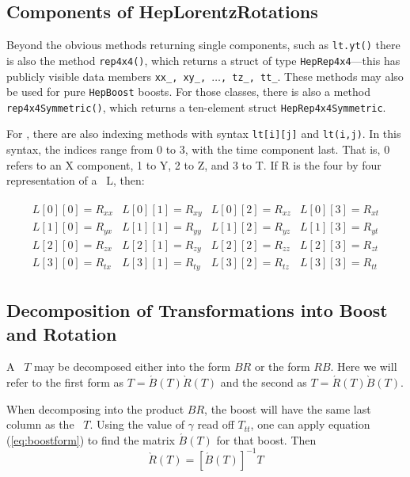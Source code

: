 \subsection{Components of HepLorentzRotations}

Beyond the obvious methods returning single components, such as 
{\tt lt.yt()} there is also the method {\tt rep4x4()}, 
which returns a struct of type {\tt HepRep4x4}---this has publicly
visible data members {\tt xx\_, xy\_, $\ldots$, tz\_, tt\_}.  These
methods may also be used for pure {\tt HepBoost} boosts.  For those
classes, there is also a method {\tt rep4x4Symmetric()}, which returns
a ten-element struct {\tt HepRep4x4Symmetric}.

For \LT, there are also indexing methods with syntax
{\tt lt[i][j]} and {\tt lt(i,j)}.  
In this syntax, the indices range from 0 to 3, with the time component last.
That is, 0 refers to an X component, 1 to Y, 2 to Z, and 3 to T.
If R is the four by four representation of a \LT\ L, then:

\begin{eqnarray}
\label{eq:ltsubscript}
\begin{array}{llll}
  L [0] [0] = R_{xx} & L [0] [1] = R_{xy} &
  L [0] [2] = R_{xz} & L [0] [3] = R_{xt} \\
\nonumber
  L [1] [0] = R_{yx} & L [1] [1] = R_{yy} &
  L [1] [2] = R_{yz} & L [1] [3] = R_{yt} \\
\nonumber
  L [2] [0] = R_{zx} & L [2] [1] = R_{zy} &
  L [2] [2] = R_{zz} & L [2] [3] = R_{zt} \\
\nonumber
  L [3] [0] = R_{tx} & L [3] [1] = R_{ty} &
  L [3] [2] = R_{tz} & L [3] [3] = R_{tt} 
\end{array}
\end{eqnarray}

\subsection{Decomposition of Transformations into Boost and Rotation}

A \LT\ $T$ may be decomposed either into the form $ B R $ or the form
$ R B $.  Here we will refer to the 
first form as $T = \acute{B}(T) \grave{R}(T)$
and the second as $T = \acute{R}(T) \grave{B}(T)$.

When decomposing into the product $ B R $, the boost
will have the same last column as the \LT\ $T$.  Using the value of
$\gamma$ read off $T_{tt}$, one can apply equation (\ref{eq:boostform}) to
find the matrix $\acute{B}(T)$ for that boost.  Then
\begin{equation}
\label{eq:decomBR}
  \grave{R}(T) = \left[ \acute{B}(T) \right] ^{-1} T
\end{equation}

